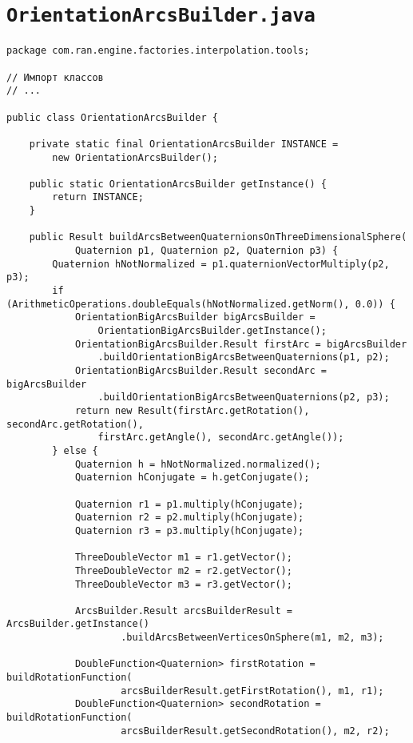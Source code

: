 \section*{\texttt{OrientationArcsBuilder.java}}
\begin{verbatim}
package com.ran.engine.factories.interpolation.tools;

// Импорт классов
// ...

public class OrientationArcsBuilder {

    private static final OrientationArcsBuilder INSTANCE =
        new OrientationArcsBuilder();

    public static OrientationArcsBuilder getInstance() {
        return INSTANCE;
    }

    public Result buildArcsBetweenQuaternionsOnThreeDimensionalSphere(
            Quaternion p1, Quaternion p2, Quaternion p3) {
        Quaternion hNotNormalized = p1.quaternionVectorMultiply(p2, p3);
        if (ArithmeticOperations.doubleEquals(hNotNormalized.getNorm(), 0.0)) {
            OrientationBigArcsBuilder bigArcsBuilder =
                OrientationBigArcsBuilder.getInstance();
            OrientationBigArcsBuilder.Result firstArc = bigArcsBuilder
                .buildOrientationBigArcsBetweenQuaternions(p1, p2);
            OrientationBigArcsBuilder.Result secondArc = bigArcsBuilder
                .buildOrientationBigArcsBetweenQuaternions(p2, p3);
            return new Result(firstArc.getRotation(), secondArc.getRotation(),
                firstArc.getAngle(), secondArc.getAngle());
        } else {
            Quaternion h = hNotNormalized.normalized();
            Quaternion hConjugate = h.getConjugate();

            Quaternion r1 = p1.multiply(hConjugate);
            Quaternion r2 = p2.multiply(hConjugate);
            Quaternion r3 = p3.multiply(hConjugate);

            ThreeDoubleVector m1 = r1.getVector();
            ThreeDoubleVector m2 = r2.getVector();
            ThreeDoubleVector m3 = r3.getVector();

            ArcsBuilder.Result arcsBuilderResult = ArcsBuilder.getInstance()
                    .buildArcsBetweenVerticesOnSphere(m1, m2, m3);

            DoubleFunction<Quaternion> firstRotation = buildRotationFunction(
                    arcsBuilderResult.getFirstRotation(), m1, r1);
            DoubleFunction<Quaternion> secondRotation = buildRotationFunction(
                    arcsBuilderResult.getSecondRotation(), m2, r2);


\end{verbatim}
